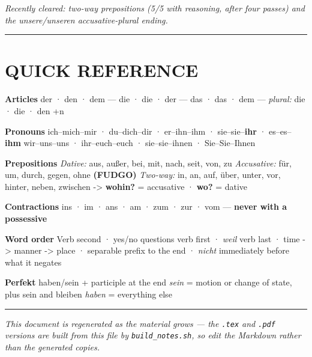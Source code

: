 \documentclass[
  11pt,
]{article}
\begin{document}
\emph{Recently cleared: two-way prepositions (5/5 with reasoning, after
four passes) and the unsere/unseren accusative-plural ending.}

\begin{center}\rule{0.5\linewidth}{0.5pt}\end{center}

\section{QUICK REFERENCE}\label{quick-reference}

\textbf{Articles} der · den · dem --- die · die · der --- das · das ·
dem --- \emph{plural:} die · die · den +n

\textbf{Pronouns} ich--mich--mir · du--dich--dir · er--ihn--ihm ·
sie--sie--\textbf{ihr} · es--es--\textbf{ihm} wir--uns--uns ·
ihr--euch--euch · sie--sie--ihnen · Sie--Sie--Ihnen

\textbf{Prepositions} \emph{Dative:} aus, außer, bei, mit, nach, seit,
von, zu \emph{Accusative:} für, um, durch, gegen, ohne \textbf{(FUDGO)}
\emph{Two-way:} in, an, auf, über, unter, vor, hinter, neben, zwischen
-\textgreater{} \textbf{wohin?} = accusative · \textbf{wo?} = dative

\textbf{Contractions} ins · im · ans · am · zum · zur · vom ---
\textbf{never with a possessive}

\textbf{Word order} Verb second · yes/no questions verb first ·
\emph{weil} verb last · time -\textgreater{} manner -\textgreater{}
place · separable prefix to the end · \emph{nicht} immediately before
what it negates

\textbf{Perfekt} haben/sein + participle at the end \emph{sein} = motion
or change of state, plus sein and bleiben \emph{haben} = everything else

\begin{center}\rule{0.5\linewidth}{0.5pt}\end{center}

\emph{This document is regenerated as the material grows --- the
\texttt{.tex} and \texttt{.pdf} versions are built from this file by
\texttt{build\_notes.sh}, so edit the Markdown rather than the generated
copies.}
\end{document}
